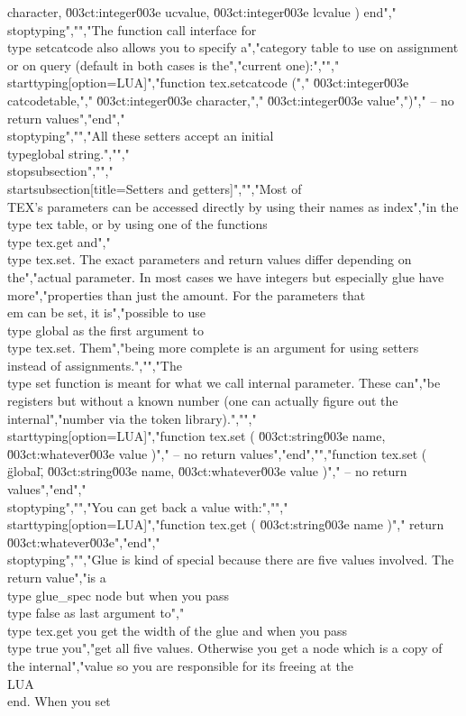 character, \u003ct:integer\u003e ucvalue, \u003ct:integer\u003e lcvalue ) end","\\stoptyping","","The function call interface for \\type {setcatcode} also allows you to specify a","category table to use on assignment or on query (default in both cases is the","current one):","","\\starttyping[option=LUA]","function tex.setcatcode (","    \u003ct:integer\u003e catcodetable,","    \u003ct:integer\u003e character,","    \u003ct:integer\u003e value",")","    -- no return values","end","\\stoptyping","","All these setters accept an initial \\type{global} string.","","\\stopsubsection","","\\startsubsection[title={Setters and getters}]","","Most of \\TEX's parameters can be accessed directly by using their names as index","in the \\type {tex} table, or by using one of the functions \\type {tex.get} and","\\type {tex.set}. The exact parameters and return values differ depending on the","actual parameter. In most cases we have integers but especially glue have more","properties than just the amount. For the parameters that {\\em can} be set, it is","possible to use \\type {global} as the first argument to \\type {tex.set}. Them","being more complete is an argument for using setters instead of assignments.","","The \\type {set} function is meant for what we call internal parameter. These can","be registers but without a known number (one can actually figure out the internal","number via the token library).","","\\starttyping[option=LUA]","function tex.set ( \u003ct:string\u003e name, \u003ct:whatever\u003e value )","    -- no return values","end","","function tex.set ( \"global\", \u003ct:string\u003e name, \u003ct:whatever\u003e value )","    -- no return values","end","\\stoptyping","","You can get back a value with:","","\\starttyping[option=LUA]","function tex.get ( \u003ct:string\u003e name )","    return \u003ct:whatever\u003e","end","\\stoptyping","","Glue is kind of special because there are five values involved. The return value","is a \\type {glue_spec} node but when you pass \\type {false} as last argument to","\\type {tex.get} you get the width of the glue and when you pass \\type {true} you","get all five values. Otherwise you get a node which is a copy of the internal","value so you are responsible for its freeing at the \\LUA\\ end. When you set 